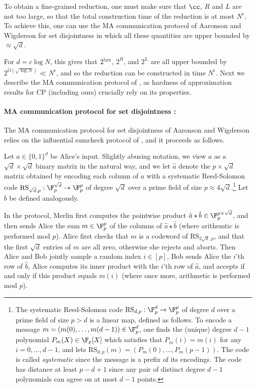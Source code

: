 \documentclass[11pt]{article}
\begin{document}
To obtain a fine-grained reduction, one must make sure that $\cc$, $R$ and $L$ are not too large,
so that the total construction time of the reduction is at most $N^{\epsilon}$. To achieve this, one can use the MA communication protocol of Aaronson and Wigderson \cite{AW09} for set disjointness in which all these quantities are upper bounded by $\approx \sqrt{d}$. 

For $d = c \log N$, this gives that $2^\cc$, $2^R$, and $2^L$ are all upper bounded by $2^{\tilde O(\sqrt{ \log N})} \ll N^{\epsilon}$, and so the reduction can be constructed in time  $N^{\epsilon}$. 
Next we describe the MA communication protocol of \cite{AW09}, as hardness of approximation results for CP (including ours) crucially rely on its properties.

\paragraph{MA communication protocol for set disjointness \cite{AW09}:} The MA communication protocol for set disjointness of Aaronson and Wigderson \cite{AW09} relies on the influential sumcheck protocol of \cite{LFKN92}, and it proceeds as follows.

Let $a \in\{0,1\}^{d}$ be Alice's input. 
Slightly abusing notation, we view $a$ as a $\sqrt{d} \times \sqrt{d}$ binary matrix in the natural way, and we let $\hat a$ denote the $p \times \sqrt{d}$ matrix obtained by encoding each column of $a$ with a systematic Reed-Solomon code $\mathrm{RS}_{\sqrt{d}, p} : \F_p^{\sqrt{d}} \to \F_p^{p}$ of degree $\sqrt{d}$ over a prime field of size $p \approx 4\sqrt{d}$.\footnote{The systematic Reed-Solomon code $\mathrm{RS}_{d,p}: \F_p^d \to \F_p^p$ of degree $d$ over a prime field of size $p>d$ is a linear map, defined as follows. To encode a message $m = (m(0),\ldots, m(d-1))  \in \F_p^d$, one finds the (unique) degree $d-1$ polynomial $P_m(X) \in \F_p[X]$ which satisfies that $P_m(i) = m(i)$ for any $i = 0, \ldots , d-1$, and lets $\mathrm{RS}_{d,p}(m)= (P_m(0), \ldots, P_m(p-1))$. The code is called \emph{systematic} since the message is a prefix of its encodings.
The code has distance at least $p-d+1$ since any pair of distinct degree $d-1$ polynomials can agree on at most $d-1$ points. }
 Let $\hat b$ be defined analogously.

In the protocol, Merlin first computes the pointwise product $\hat a \star \hat b \in \F_p^{p\times \sqrt{d}}$, and then sends Alice the sum $m \in \F_p^p$ of the columns of $\hat a \star \hat b$ (where arithemtic is performed mod $p$). Alice first checks that $m$ is a codeword of $\mathrm{RS}_{2\sqrt{d},p}$, and that the first $\sqrt{d}$ entries of $m$ are all zero, otherwise she rejects and aborts.
Then Alice and Bob jointly sample a random index $i \in [p]$, Bob sends Alice the $i$'th row of $\hat b$, Alice computes its inner product with the $i$'th row of $\hat a$, and accepts if and only if this product equals $m(i)$ (where once more, arithmetic is performed mod $p$).
 
\end{document}
